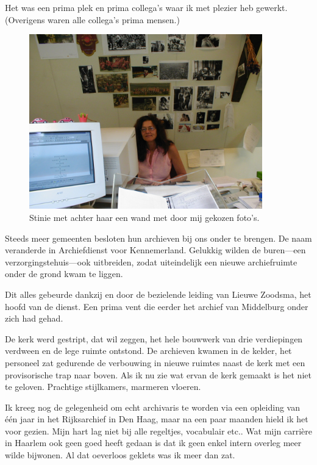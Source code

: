 \documentclass[12pt,twoside, openright]{memoir}
\begin{document}
Het was een prima plek en prima collega’s waar ik met plezier heb gewerkt. (Overigens waren alle collega’s prima mensen.)

\begin{figure}
\centering
\includegraphics[width=0.9\textwidth]{img/ch47/Stinie}
\caption*{\footnotesize Stinie met achter haar een wand met door mij gekozen foto's.}
\end{figure}

Steeds meer gemeenten besloten hun archieven bij ons onder te brengen. De naam veranderde in Archiefdienst voor Kennemerland. Gelukkig wilden de buren---een verzorgingstehuis---ook uitbreiden, zodat uiteindelijk een nieuwe archiefruimte onder de grond kwam te liggen. 

Dit alles gebeurde dankzij en door de bezielende leiding van Lieuwe Zoodsma, het hoofd van de dienst. Een prima vent die eerder het archief van Middelburg onder zich had gehad.

De kerk werd gestript, dat wil zeggen, het hele bouwwerk van drie verdiepingen verdween en de lege ruimte ontstond. De archieven kwamen in de kelder, het personeel zat gedurende de verbouwing in nieuwe ruimtes naast de kerk met een provisorische trap naar boven. Als ik nu zie wat ervan de kerk gemaakt is het niet te geloven. Prachtige stijlkamers, marmeren vloeren.

Ik kreeg nog de gelegenheid om echt archivaris te worden via een opleiding van één jaar in het Rijksarchief in Den Haag, maar na een paar maanden hield ik het voor gezien. Mijn hart lag niet bij alle regeltjes, vocabulair etc.. Wat mijn carrière in Haarlem ook geen goed heeft gedaan is dat ik geen enkel intern overleg meer wilde bijwonen. Al dat oeverloos geklets was ik meer dan zat. 
\end{document}
